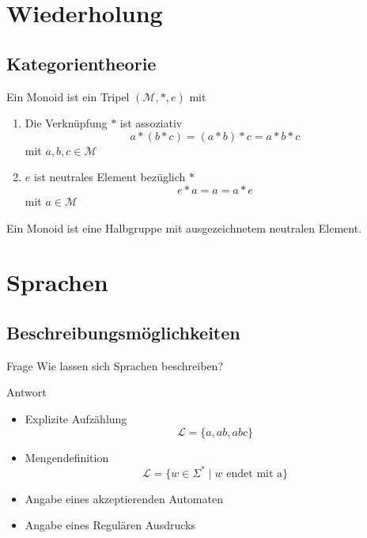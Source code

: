 \documentclass[]{beamer}
\begin{document}
\section{Wiederholung}
\subsection{Kategorientheorie}
\begin{frame}[squeeze]{}{}
  \begin{definition}
    Ein Monoid ist ein Tripel $(\mathcal{M}, *, e)$ mit
    \begin{enumerate}
      \item Die Verknüpfung $*$ ist assoziativ
        \[a * (b * c) = (a * b) * c = a * b * c\]
        mit $a, b, c \in \mathcal{M}$
      \item $e$ ist neutrales Element bezüglich $*$
        \[e * a = a = a * e\]
        mit $a \in \mathcal{M}$
    \end{enumerate}
    Ein Monoid ist eine Halbgruppe mit ausgezeichnetem neutralen Element.
  \end{definition}
\end{frame}

\section{Sprachen}
\subsection{Beschreibungsmöglichkeiten}
\begin{frame}[<+->][squeeze]{}
  \begin{alertblock}{Frage}
    Wie lassen sich Sprachen beschreiben?
  \end{alertblock}
  
  \begin{exampleblock}{Antwort}
    \begin{itemize}
      \item<2-> Explizite Aufzählung
        \[\mathcal{L} = \{a, ab, abc\}\]
      \item<3-> Mengendefinition
        \[\mathcal{L} = \{w \in \Sigma^* \;|\; w \text{ endet mit a}\}\]
      \item<4-> Angabe eines akzeptierenden Automaten
      \item<5-> Angabe eines Regulären Ausdrucks
    \end{itemize}
  \end{exampleblock}
\end{frame}
\end{document}
